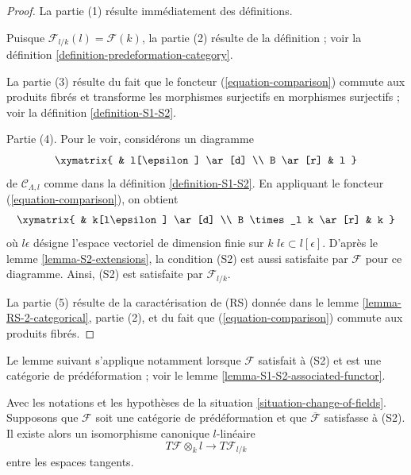 \begin{proof}
La partie (1) résulte immédiatement des définitions.

\medskip\noindent
Puisque $\mathcal{F}_{l/k}(l) = \mathcal{F}(k)$, la partie (2) résulte de la
définition ; voir la définition \ref{definition-predeformation-category}.

\medskip\noindent
La partie (3) résulte du fait que le foncteur (\ref{equation-comparison})
commute aux produits fibrés et transforme les morphismes surjectifs en
morphismes surjectifs ; voir la définition \ref{definition-S1-S2}.

\medskip\noindent
Partie (4). Pour le voir, considérons un diagramme
$$
\xymatrix{
          & l[\epsilon] \ar[d] \\
B  \ar[r] & l
}
$$
de $\mathcal{C}_{\Lambda, l}$ comme dans la définition
\ref{definition-S1-S2}. En appliquant le foncteur
(\ref{equation-comparison}), on obtient
$$
\xymatrix{
          & k[l\epsilon] \ar[d] \\
B \times_l k  \ar[r] & k
}
$$
où $l\epsilon$ désigne l'espace vectoriel de dimension finie sur $k$
$l\epsilon \subset l[\epsilon]$. D'après le lemme
\ref{lemma-S2-extensions}, la condition (S2) est aussi satisfaite par $\mathcal{F}$
pour ce diagramme. Ainsi, (S2) est satisfaite par $\mathcal{F}_{l/k}$.

\medskip\noindent
La partie (5) résulte de la caractérisation de (RS) donnée dans le lemme
\ref{lemma-RS-2-categorical}, partie (2), et du fait que
(\ref{equation-comparison}) commute aux produits fibrés.
\end{proof}

\noindent
Le lemme suivant s'applique notamment lorsque $\mathcal{F}$ satisfait à (S2)
et est une catégorie de prédéformation ; voir le lemme
\ref{lemma-S1-S2-associated-functor}.

\begin{lemma}
\label{lemma-tangent-space-change-of-field}
Avec les notations et les hypothèses de la situation
\ref{situation-change-of-fields}. Supposons que $\mathcal{F}$ soit une
catégorie de prédéformation et que $\overline{\mathcal{F}}$ satisfasse à (S2).
Il existe alors un isomorphisme canonique $l$-linéaire
$$
T\mathcal{F} \otimes_k l \longrightarrow T\mathcal{F}_{l/k}
$$
entre les espaces tangents.
\end{lemma}

